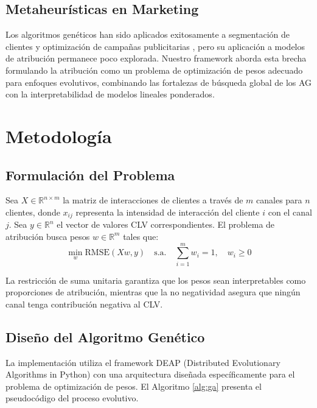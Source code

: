 \documentclass[conference]{IEEEtran}
\begin{document}
\subsection{Metaheurísticas en Marketing}
Los algoritmos genéticos han sido aplicados exitosamente a segmentación de clientes \cite{ngai2009} y optimización de campañas publicitarias \cite{ghose2009}, pero su aplicación a modelos de atribución permanece poco explorada. Nuestro framework aborda esta brecha formulando la atribución como un problema de optimización de pesos adecuado para enfoques evolutivos, combinando las fortalezas de búsqueda global de los AG con la interpretabilidad de modelos lineales ponderados.

\section{Metodología}

\subsection{Formulación del Problema}
Sea $X \in \mathbb{R}^{n \times m}$ la matriz de interacciones de clientes a través de $m$ canales para $n$ clientes, donde $x_{ij}$ representa la intensidad de interacción del cliente $i$ con el canal $j$. Sea $y \in \mathbb{R}^n$ el vector de valores CLV correspondientes. El problema de atribución busca pesos $w \in \mathbb{R}^m$ tales que:
\begin{equation}
\min_{w} \text{RMSE}(Xw, y) \quad \text{s.a.} \quad \sum_{i=1}^{m} w_i = 1, \quad w_i \geq 0
\end{equation}

La restricción de suma unitaria garantiza que los pesos sean interpretables como proporciones de atribución, mientras que la no negatividad asegura que ningún canal tenga contribución negativa al CLV.

\subsection{Diseño del Algoritmo Genético}
La implementación utiliza el framework DEAP (Distributed Evolutionary Algorithms in Python) con una arquitectura diseñada específicamente para el problema de optimización de pesos. El Algoritmo \ref{alg:ga} presenta el pseudocódigo del proceso evolutivo.
\end{document}
